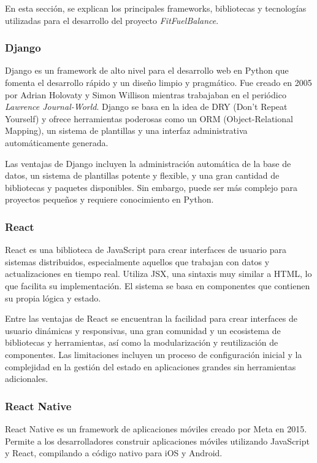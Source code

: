 En esta sección, se explican los principales frameworks, bibliotecas y tecnologías utilizadas para el desarrollo del proyecto \textit{FitFuelBalance}.

\subsubsection{Django}

Django es un framework de alto nivel para el desarrollo web en Python que fomenta el desarrollo rápido y un diseño limpio y pragmático. Fue creado en 2005 por Adrian Holovaty y Simon Willison mientras trabajaban en el periódico \textit{Lawrence Journal-World}. Django se basa en la idea de DRY (Don’t Repeat Yourself) y ofrece herramientas poderosas como un ORM (Object-Relational Mapping), un sistema de plantillas y una interfaz administrativa automáticamente generada\cite{Django}.

Las ventajas de Django incluyen la administración automática de la base de datos, un sistema de plantillas potente y flexible, y una gran cantidad de bibliotecas y paquetes disponibles. Sin embargo, puede ser más complejo para proyectos pequeños y requiere conocimiento en Python.

\subsubsection{React}

React es una biblioteca de JavaScript para crear interfaces de usuario para sistemas distribuidos, especialmente aquellos que trabajan con datos y actualizaciones en tiempo real. Utiliza JSX, una sintaxis muy similar a HTML, lo que facilita su implementación. El sistema se basa en componentes que contienen su propia lógica y estado\cite{React}.

Entre las ventajas de React se encuentran la facilidad para crear interfaces de usuario dinámicas y responsivas, una gran comunidad y un ecosistema de bibliotecas y herramientas, así como la modularización y reutilización de componentes. Las limitaciones incluyen un proceso de configuración inicial y la complejidad en la gestión del estado en aplicaciones grandes sin herramientas adicionales.

\subsubsection{React Native}

React Native es un framework de aplicaciones móviles creado por Meta en 2015. Permite a los desarrolladores construir aplicaciones móviles utilizando JavaScript y React, compilando a código nativo para iOS y Android\cite{ReactNative}.

